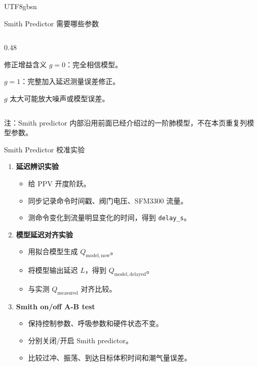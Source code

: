 \documentclass[aspectratio=169,10pt]{beamer}
\newcommand{\code}[1]{\texttt{\small #1}}
\begin{document}
\begin{CJK*}{UTF8}{gbsn}
\begin{frame}{Smith Predictor 需要哪些参数}
\begin{columns}[T,onlytextwidth]
\begin{column}{0.48\textwidth}
      \begin{block}{修正增益含义}
        $g=0$：完全相信模型。

        $g=1$：完整加入延迟测量误差修正。

        $g$ 太大可能放大噪声或模型误差。
      \end{block}
    \end{column}
  \end{columns}

  \vspace{0.2em}
  \centering
  注：Smith predictor 内部沿用前面已经介绍过的一阶肺模型，不在本页重复列模型参数。
\end{frame}

\begin{frame}[shrink=5]{Smith Predictor 校准实验}
  \begin{enumerate}
    \item \textbf{延迟辨识实验}
      \begin{itemize}
        \item 给 PPV 开度阶跃。
        \item 同步记录命令时间戳、阀门电压、SFM3300 流量。
        \item 测命令变化到流量明显变化的时间，得到 \code{delay\_s}。
      \end{itemize}

    \item \textbf{模型延迟对齐实验}
      \begin{itemize}
        \item 用拟合模型生成 $Q_{\mathrm{model,now}}$。
        \item 将模型输出延迟 $L$，得到 $Q_{\mathrm{model,delayed}}$。
        \item 与实测 $Q_{\mathrm{measured}}$ 对齐比较。
      \end{itemize}

    \item \textbf{Smith on/off A-B test}
      \begin{itemize}
        \item 保持控制参数、呼吸参数和硬件状态不变。
        \item 分别关闭/开启 Smith predictor。
        \item 比较过冲、振荡、到达目标体积时间和潮气量误差。
      \end{itemize}
  \end{enumerate}
\end{frame}


\end{CJK*}
\end{document}
